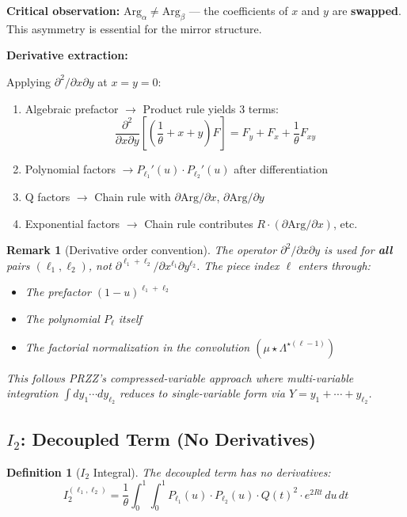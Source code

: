 \documentclass[11pt]{article}
\newtheorem{definition}{Definition}
\newtheorem{remark}{Remark}
\begin{document}
\textbf{Critical observation:} $\text{Arg}_\alpha \neq \text{Arg}_\beta$ --- the coefficients of $x$ and $y$ are \textbf{swapped}. This asymmetry is essential for the mirror structure.

\textbf{Derivative extraction:}

Applying $\partial^2/\partial x \partial y$ at $x = y = 0$:
\begin{enumerate}
\item Algebraic prefactor $\to$ Product rule yields 3 terms:
  \begin{equation}
  \frac{\partial^2}{\partial x \partial y}\left[\left(\frac{1}{\theta} + x + y\right) F\right] = F_y + F_x + \frac{1}{\theta} F_{xy}
  \end{equation}
\item Polynomial factors $\to P_{\ell_1}'(u) \cdot P_{\ell_2}'(u)$ after differentiation
\item Q factors $\to$ Chain rule with $\partial \text{Arg}/\partial x$, $\partial \text{Arg}/\partial y$
\item Exponential factors $\to$ Chain rule contributes $R \cdot (\partial \text{Arg}/\partial x)$, etc.
\end{enumerate}

\begin{remark}[Derivative order convention]
\label{rem:derivative-order}
The operator $\partial^2/\partial x \partial y$ is used for \textbf{all} pairs $(\ell_1, \ell_2)$, not $\partial^{\ell_1+\ell_2}/\partial x^{\ell_1} \partial y^{\ell_2}$. The piece index $\ell$ enters through:
\begin{itemize}
\item The prefactor $(1-u)^{\ell_1+\ell_2}$
\item The polynomial $P_\ell$ itself
\item The factorial normalization in the convolution $(\mu \star \Lambda^{\star(\ell-1)})$
\end{itemize}
This follows PRZZ's compressed-variable approach where multi-variable integration $\int dy_1 \cdots dy_{\ell_2}$ reduces to single-variable form via $Y = y_1 + \cdots + y_{\ell_2}$.
\end{remark}

\subsection{$I_2$: Decoupled Term (No Derivatives)}

\begin{definition}[$I_2$ Integral]
The decoupled term has no derivatives:
\begin{equation}
\boxed{
I_2^{(\ell_1,\ell_2)} = \frac{1}{\theta} \int_0^1 \int_0^1 P_{\ell_1}(u) \cdot P_{\ell_2}(u) \cdot Q(t)^2 \cdot e^{2Rt} \, du\, dt
}
\end{equation}
\end{definition}
\end{document}

